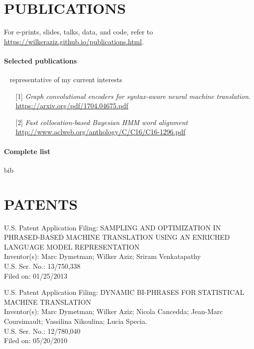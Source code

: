 \section*{PUBLICATIONS}

For e-prints, slides, talks, data, and code, refer to \url{https://wilkeraziz.github.io/publications.html}. 



\paragraph{Selected publications} ~ representative of my current interests
\begin{itemize}
	\item[] [1] \emph{Graph convolutional encoders for syntax-aware neural machine translation.} \\
	\url{https://arxiv.org/pdf/1704.04675.pdf}
	\item[] [2] \emph{Fast collocation-based Bayesian HMM word alignment} \\
	\url{http://www.aclweb.org/anthology/C/C16/C16-1296.pdf}
\end{itemize}

\paragraph{Complete list}


\begin{btSect}{bib}
\btPrintNotCited
\end{btSect}


\section*{PATENTS}

\begin{description}
\item U.S. Patent Application Filing: SAMPLING AND OPTIMIZATION IN PHRASED-BASED MACHINE TRANSLATION USING AN ENRICHED LANGUAGE MODEL REPRESENTATION \\
Inventor(s): Marc Dymetman; Wilker Aziz; Sriram Venkatapathy \\
U.S. Ser. No.:  13/750,338 \\
Filed on: 01/25/2013 
\end{description}

\begin{description}
\item U.S. Patent Application Filing: DYNAMIC BI-PHRASES FOR STATISTICAL MACHINE TRANSLATION  \\
Inventor(s): Marc Dymetman; Wilker Aziz; Nicola Cancedda; Jean-Marc Coursimault;  Vassilina Nikoulina; Lucia Specia. \\
U.S. Ser. No.:  12/780,040 \\
Filed on: 05/20/2010  \\
\end{description}